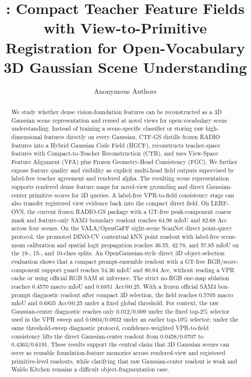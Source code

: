 \documentclass[10pt,twocolumn,letterpaper]{article}
\title{\method{}: Compact Teacher Feature Fields with View-to-Primitive Registration for Open-Vocabulary 3D Gaussian Scene Understanding}
\author{Anonymous Authors}
\date{}
\newcommand{\method}{CTF-GS}
\newcommand{\project}{RADIO-GS}
\begin{document}
\maketitle

\begin{abstract}
We study whether dense vision-foundation features can be reconstructed as a
3D Gaussian scene representation and reused at novel views for open-vocabulary
scene understanding. Instead of training a scene-specific classifier or storing
raw high-dimensional features directly on every Gaussian, \method{} distills
frozen RADIO features into a Hybrid Gaussian Code Field (HGCF), reconstructs
teacher-space features with Compact-to-Teacher Reconstruction (CTR), and uses
View-Space Feature Alignment (VFA) plus Frozen Geometry-Head Consistency (FGC).
We further expose feature quality and visibility as explicit multi-head field
outputs supervised by label-free teacher agreement and rendered alpha.
The resulting scene representation supports rendered dense feature maps for
novel-view grounding and direct Gaussian-center primitive scores for 3D
queries. A label-free VPR-to-field consistency stage can also transfer
registered view evidence back into the compact direct field. On LERF-OVS, the current frozen \project{} package with a
GT-free peak-component coarse mask and feature-only SAM3 boundary readout reaches
64.98 mIoU and 82.68 Acc across four scenes. On the VALA/OpenGaFF eight-scene
ScanNet direct point-query protocol, the promoted DINO-CV contextual kNN point
readout with label-free scene-mean calibration and spatial logit propagation
reaches 36.55, 42.78, and 57.85 mIoU on the 19-, 15-, and 10-class splits. An
OpenGaussian-style direct 3D object-selection evaluation shows that a
compact prompt-ensemble readout with a GT-free RGB/score-component support guard
reaches 54.36 mIoU and 80.84 Acc, without reading a
VPR cache or using official RGB SAM at inference. The strict no-RGB one-map
ablation reaches 0.4570 macro mIoU and 0.6851 Acc@0.25. With a frozen official
SAM3 box-prompt diagnostic readout after
compact 3D selection, the field reaches 0.5705 macro mIoU and 0.6835 Acc@0.25
under a fixed global threshold. For context, the raw Gaussian-center
diagnostic reaches only 0.012/0.009 under the fixed top-2\% selector used in
the VPR sweep and 0.0804/0.0932 under an earlier top-10\% selector; under the
same threshold-sweep diagnostic protocol, confidence-weighted VPR-to-field
consistency lifts the direct Gaussian-center readout from 0.0458/0.0707 to
0.4363/0.6191. These results
support the central claim that 3D Gaussian scenes can serve as reusable
foundation-feature memories across rendered-view and registered primitive-level
readouts, while clarifying that raw Gaussian-center readout is weak and Waldo
Kitchen remains a difficult object-fragmentation case.
\end{abstract}
\end{document}
